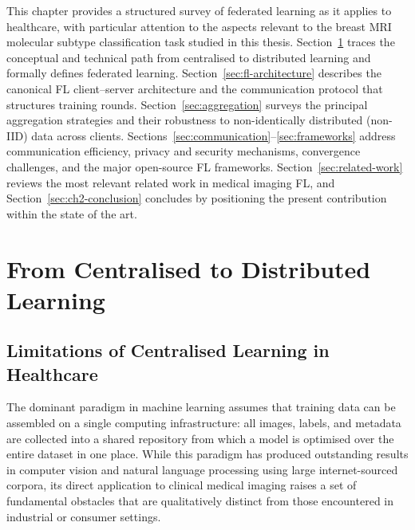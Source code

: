 This chapter provides a structured survey of federated learning as it
applies to healthcare, with particular attention to the aspects
relevant to the breast MRI molecular subtype classification task
studied in this thesis.
Section~\ref{sec:centralised-to-fl} traces the conceptual and
technical path from centralised to distributed learning and formally
defines federated learning.
Section~\ref{sec:fl-architecture} describes the canonical FL
client–server architecture and the communication protocol that
structures training rounds.
Section~\ref{sec:aggregation} surveys the principal aggregation
strategies and their robustness to non-identically distributed (non-IID)
data across clients.
Sections~\ref{sec:communication}–\ref{sec:frameworks} address
communication efficiency, privacy and security mechanisms, convergence
challenges, and the major open-source FL frameworks.
Section~\ref{sec:related-work} reviews the most relevant related work
in medical imaging FL, and Section~\ref{sec:ch2-conclusion} concludes
by positioning the present contribution within the state of the art.


\section{From Centralised to Distributed Learning}
\label{sec:centralised-to-fl}


\subsection{Limitations of Centralised Learning in Healthcare}
\label{sec:centralised-limits}

The dominant paradigm in machine learning assumes that training data
can be assembled on a single computing infrastructure: all images,
labels, and metadata are collected into a shared repository from which
a model is optimised over the entire dataset in one place.
While this paradigm has produced outstanding results in computer vision
and natural language processing using large internet-sourced corpora,
its direct application to clinical medical imaging raises a set of
fundamental obstacles that are qualitatively distinct from those
encountered in industrial or consumer settings.

